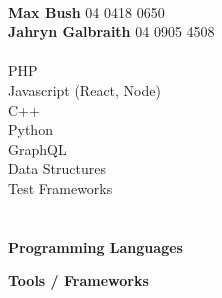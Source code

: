 \documentclass[9pt]{developercv}
\newcommand{\CC}{C\nolinebreak\hspace{-.05em}\raisebox{.4ex}{\tiny\bf +}\nolinebreak\hspace{-.10em}\raisebox{.4ex}{\tiny\bf +}}
\def\CC{{C\nolinebreak[4]\hspace{-.05em}\raisebox{.4ex}{\tiny\bf ++}}}
\begin{document}
	\begin{minipage}[t]{0.3\textwidth}		%
		\\
		\textbf{Max Bush} 04 0418 0650\\
		\textbf{Jahryn Galbraith} 04 0905 4508\\

		\\
		{PHP}\\
		{Javascript (React, Node)}\\
		{C++}\\
		{Python}\\
		{GraphQL}\\
		{Data Structures}\\
		{Test Frameworks}\\
		
		\\
		\\\textbf{Programming Languages}\\
		\begin{barchart}{3.0}
				\baritem{\CC}{100}
		\end{barchart}
				
		\textbf{Tools / Frameworks}\\
		\begin{barchart}{3.0}
			\end{barchart}
	\end{minipage}
\end{document}

